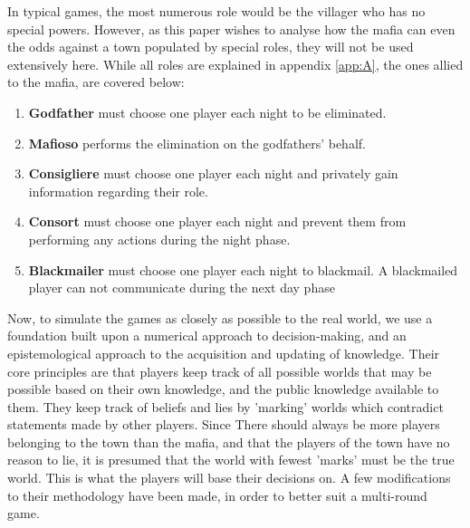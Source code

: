 In typical games, the most numerous role would be the villager who has no special
powers. However, as this paper wishes to analyse how the mafia
can even the odds against a town populated by special roles, they will not be
used extensively here. While all roles are explained in appendix \ref{app:A}, the ones allied to the mafia, are covered below:

\begin{enumerate}
	\itemsep0px
	\item\textbf{Godfather} must choose one player each night to be eliminated.
	\item\textbf{Mafioso} performs the elimination on the godfathers' behalf.
	\item\textbf{Consigliere} must choose one player each night and privately
	      gain information regarding their role.
	\item\textbf{Consort} must choose one player each night and prevent them
	      from performing any actions during the night phase.
	\item\textbf{Blackmailer} must choose one player each night to blackmail. A
	      blackmailed player can not communicate during the next day phase
	      \label{lst:Roles}
\end{enumerate}

Now, to simulate the games as closely as possible to the real world, we use a
foundation built upon a numerical approach to decision-making, and an
epistemological approach to the acquisition and updating of
knowledge\cite{commitment}. Their core principles are that players keep track
of all possible worlds that may be possible based on their own knowledge, and
the public knowledge available to them. They keep track of beliefs and lies by
'marking' worlds which contradict statements made by other players. Since There should always be more players belonging to the town than the
mafia, and that the players of the town have no reason to lie, it is presumed
that the world with fewest 'marks' must be the true world. This is what the players
will base their decisions on. A few modifications to their\cite{commitment} methodology have
been made, in order to better suit a multi-round game.

